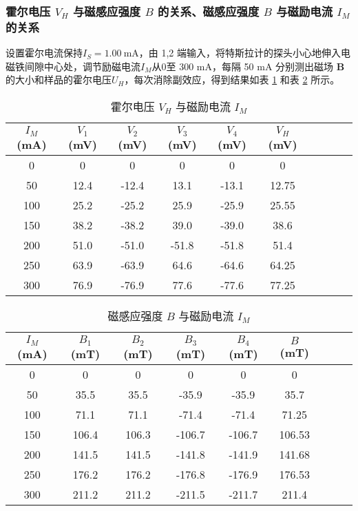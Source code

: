 \documentclass[11pt]{article}
\begin{document}
	\subsubsection{霍尔电压 $V_H$ 与磁感应强度 $B$ 的关系、磁感应强度 $B$ 与磁励电流 $I_M$ 的关系}
	设置霍尔电流保持$ I_S = 1.00 \ \mathrm{mA}$，由 1,2 端输入，将特斯拉计的探头小心地伸入电磁铁间隙中心处，调节励磁电流$ I_M $从$ 0 $至 300 mA，每隔 50 mA 分别测出磁场 $\boldsymbol{B}$ 的大小和样品的霍尔电压$ U_H $，每次消除副效应，得到结果如表 \ref{霍尔电压与磁励电流} 和表 \ref{磁感应强度与磁励电流} 所示。
	
	\begin{table}[H]\centering
		\caption{霍尔电压 $V_H$ 与磁励电流 $I_M$}
		\label{霍尔电压与磁励电流}
		\begin{tabular}{cccccccccc}\toprule
			$I_M$ (mA) & $V_1$ (mV)  & $V_2$ (mV)  & $V_3$ (mV)   & $V_4$ (mV)   & $V_H$ (mV)    \\
			\midrule
			0          & 0          & 0          & 0          & 0          & 0 \\
			50         & 12.4       & -12.4      & 13.1       & -13.1      & 12.75 \\
			100        & 25.2       & -25.2      & 25.9       & -25.9      & 25.55 \\
			150        & 38.2       & -38.2      & 39.0       & -39.0      & 38.6 \\
			200        & 51.0        & -51.0     & -51.8     & -51.8       & 51.4 \\
			250		&	63.9	&	-63.9	&	64.6	& 	-64.6	&	64.25 \\
			300        & 76.9       & -76.9      & 77.6       & -77.6      & 77.25 \\
			\bottomrule
		\end{tabular}
	\end{table}
	
	\begin{table}[H]\centering
		\caption{磁感应强度 $B$ 与磁励电流 $I_M$}
		\label{磁感应强度与磁励电流}
		\begin{tabular}{ccccccccc}\toprule
			$I_M$ (mA) & $B_1$ (mT)  & $B_2$ (mT)  & $B_3$ (mT)   & $B_4$ (mT)   & $B$ (mT)    \\
			\midrule
			0	&0	&0	&0	&0	    &     0\\
			50	&35.5	&35.5	&-35.9	&-35.9	    &35.7\\
			100	&71.1	&71.1	&-71.4	&-71.4	    &  71.25\\
			150	&106.4	&106.3	&-106.7	&-106.7	    &106.53\\
			200	&141.5	&141.5	&-141.8	&-141.9     &141.68\\
			250	&176.2	&176.2  &-176.8	&-176.9	    & 176.53\\
			300	&211.2  &211.2	&-211.5	&-211.7	    &211.4\\
			\bottomrule
		\end{tabular}
	\end{table}
	
\end{document}
